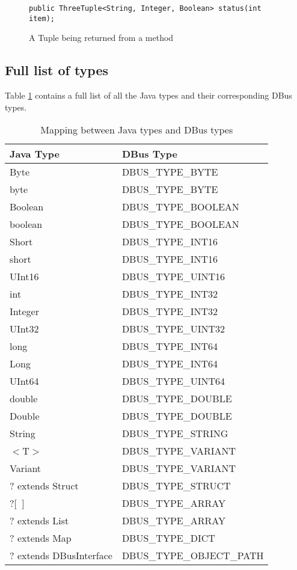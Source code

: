 \documentclass[a4paper,12pt]{article}
\begin{document}
\begin{figure}[htb]
\begin{center}
\begin{verbatim}
public ThreeTuple<String, Integer, Boolean> status(int item);
\end{verbatim}
\end{center}
\caption{A Tuple being returned from a method}
\label{fig:tuple}
\end{figure}

\subsection{Full list of types}

Table \ref{table:types} contains a full list of all the Java types and their corresponding DBus types.

\begin{table}
\begin{center}
\begin{tabular}{l|l}
\bf Java Type & \bf DBus Type \\
\hline
Byte	&	DBUS\_TYPE\_BYTE	\\
byte	&	DBUS\_TYPE\_BYTE	\\
Boolean	&	DBUS\_TYPE\_BOOLEAN	\\
boolean	&	DBUS\_TYPE\_BOOLEAN	\\
Short	&	DBUS\_TYPE\_INT16	\\
short	&	DBUS\_TYPE\_INT16	\\
UInt16	&	DBUS\_TYPE\_UINT16	\\
int	&	DBUS\_TYPE\_INT32	\\
Integer	&	DBUS\_TYPE\_INT32	\\
UInt32	&	DBUS\_TYPE\_UINT32	\\
long	&	DBUS\_TYPE\_INT64	\\
Long	&	DBUS\_TYPE\_INT64	\\
UInt64	&	DBUS\_TYPE\_UINT64	\\
double	&	DBUS\_TYPE\_DOUBLE	\\
Double	&	DBUS\_TYPE\_DOUBLE	\\
String	&	DBUS\_TYPE\_STRING	\\
$<$T$>$	&	DBUS\_TYPE\_VARIANT	\\
Variant	&	DBUS\_TYPE\_VARIANT	\\
? extends Struct	&	DBUS\_TYPE\_STRUCT	\\
?$[$~$]$	&	DBUS\_TYPE\_ARRAY	\\
? extends List	&	DBUS\_TYPE\_ARRAY	\\
? extends Map	&	DBUS\_TYPE\_DICT	\\
? extends DBusInterface	&	DBUS\_TYPE\_OBJECT\_PATH	\\
\end{tabular}
\end{center}
\caption{Mapping between Java types and DBus types}
\label{table:types}
\end{table}
\end{document}
